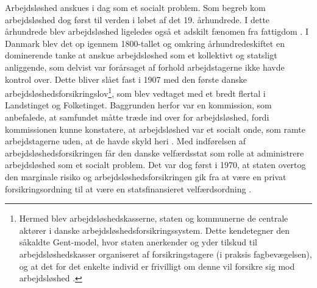 Arbejdsløshed anskues i dag som et socialt problem. Som begreb kom arbejdsløshed dog først til verden i løbet af det 19. århundrede. I dette århundrede blev arbejdsløshed ligeledes også et adskilt fænomen fra fattigdom \parencite[3]{Halvorsen1999}. I Danmark blev det op igennem 1800-tallet og omkring århundredeskiftet en dominerende tanke at anskue arbejdsløshed som et kollektivt og statsligt anliggende, som delvist var forårsaget af forhold arbejdstagerne ikke havde kontrol over. Dette bliver slået fast i 1907 med den første danske arbejdsløshedsforsikringslov\footnote{Hermed blev arbejdsløshedskasserne, staten og kommunerne de centrale aktører i  danske arbejdsløshedsforsikringssystem. Dette kendetegner den såkaldte Gent-model, hvor staten anerkender og yder tilskud til arbejdsløshedskasser organiseret af forsikringstagere (i praksis fagbevægelsen), og at det for det enkelte individ er frivilligt om denne vil forsikre sig mod arbejdsløshed \parencite{Jensen2007a}.}, som blev vedtaget med et bredt flertal i Landstinget og Folketinget. Baggrunden herfor var en kommission, som anbefalede, at samfundet måtte træde ind over for arbejdsløshed, fordi kommissionen kunne konstatere, at arbejdsløshed var et socialt onde, som ramte arbejdstagerne uden, at de havde skyld heri \parencite[69]{Pedersen2007}. Med indførelsen af arbejdsløshedsforsikringen får den danske velfærdsstat som rolle at administrere arbejdsløshed som et socialt problem. Det var dog først i 1970, at staten overtog den marginale risiko og arbejdsløshedsforsikringen gik fra at være en privat forsikringsordning til at være en statsfinansieret velfærdsordning \parencite[83]{Pedersen2007}. %

